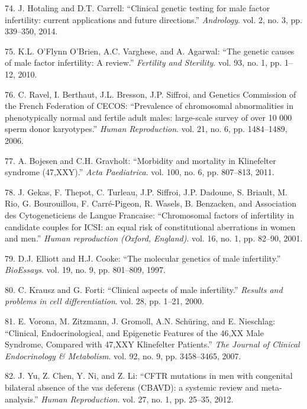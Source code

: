 \documentclass[12pt,a4paper,twoside]{ugathesis}
\theoremstyle{definition}
\theoremstyle{definition}
\theoremstyle{definition}
\theoremstyle{remark}
\begin{document}
\hypertarget{ref-Hotaling2014}{}
74. J. Hotaling and D.T. Carrell: ``Clinical genetic testing for male
factor infertility: current applications and future directions.''
\emph{Andrology}. vol. 2, no. 3, pp. 339--350, 2014.

\hypertarget{ref-OFlynnOBrien2010}{}
75. K.L. O'Flynn O'Brien, A.C. Varghese, and A. Agarwal: ``The genetic
causes of male factor infertility: A review.'' \emph{Fertility and
Sterility}. vol. 93, no. 1, pp. 1--12, 2010.

\hypertarget{ref-Ravel2006}{}
76. C. Ravel, I. Berthaut, J.L. Bresson, J.P. Siffroi, and Genetics
Commission of the French Federation of CECOS: ``Prevalence of
chromosomal abnormalities in phenotypically normal and fertile adult
males: large-scale survey of over 10 000 sperm donor karyotypes.''
\emph{Human Reproduction}. vol. 21, no. 6, pp. 1484--1489, 2006.

\hypertarget{ref-Bojesen2011}{}
77. A. Bojesen and C.H. Gravholt: ``Morbidity and mortality in
Klinefelter syndrome (47,XXY).'' \emph{Acta Paediatrica}. vol. 100, no.
6, pp. 807--813, 2011.

\hypertarget{ref-Gekas2001}{}
78. J. Gekas, F. Thepot, C. Turleau, J.P. Siffroi, J.P. Dadoune, S.
Briault, M. Rio, G. Bourouillou, F. Carré-Pigeon, R. Wasels, B.
Benzacken, and Association des Cytogeneticiens de Langue Francaise:
``Chromosomal factors of infertility in candidate couples for ICSI: an
equal risk of constitutional aberrations in women and men.'' \emph{Human
reproduction (Oxford, England)}. vol. 16, no. 1, pp. 82--90, 2001.

\hypertarget{ref-Elliott1997}{}
79. D.J. Elliott and H.J. Cooke: ``The molecular genetics of male
infertility.'' \emph{BioEssays}. vol. 19, no. 9, pp. 801--809, 1997.

\hypertarget{ref-Krausz2000}{}
80. C. Krausz and G. Forti: ``Clinical aspects of male infertility.''
\emph{Results and problems in cell differentiation}. vol. 28, pp. 1--21,
2000.

\hypertarget{ref-Vorona2007}{}
81. E. Vorona, M. Zitzmann, J. Gromoll, A.N. Schüring, and E. Nieschlag:
``Clinical, Endocrinological, and Epigenetic Features of the 46,XX Male
Syndrome, Compared with 47,XXY Klinefelter Patients.'' \emph{The Journal
of Clinical Endocrinology \& Metabolism}. vol. 92, no. 9, pp.
3458--3465, 2007.

\hypertarget{ref-Yu2012}{}
82. J. Yu, Z. Chen, Y. Ni, and Z. Li: ``CFTR mutations in men with
congenital bilateral absence of the vas deferens (CBAVD): a systemic
review and meta-analysis.'' \emph{Human Reproduction}. vol. 27, no. 1,
pp. 25--35, 2012.
\end{document}
